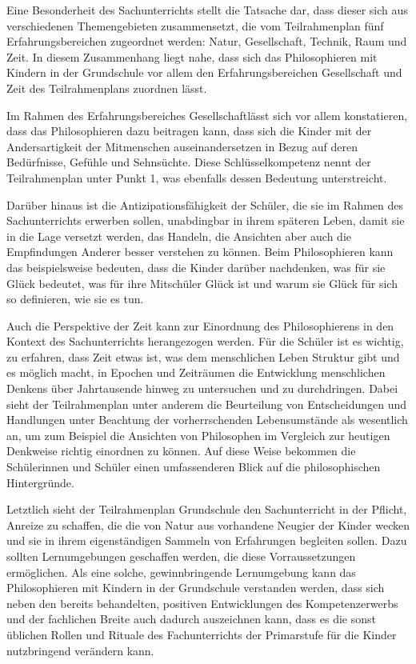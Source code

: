 Eine Besonderheit des Sachunterrichts stellt die Tatsache dar, dass dieser sich aus verschiedenen Themengebieten zusammensetzt, die vom Teilrahmenplan fünf Erfahrungsbereichen zugeordnet werden: Natur, Gesellschaft, Technik, Raum und Zeit. 
In diesem Zusammenhang liegt nahe, dass sich das Philosophieren mit Kindern in der Grundschule vor allem den Erfahrungsbereichen \glqq Gesellschaft\grqq{} und \glqq Zeit\grqq{} des Teilrahmenplans zuordnen lässt. 

Im Rahmen des Erfahrungsbereiches \glqq Gesellschaft\grqq lässt sich vor allem konstatieren, dass das Philosophieren dazu beitragen kann, dass sich die Kinder mit der Andersartigkeit der Mitmenschen auseinandersetzen in Bezug auf deren Bedürfnisse, Gefühle und Sehnsüchte. 
Diese Schlüsselkompetenz nennt der Teilrahmenplan unter Punkt 1, was ebenfalls dessen Bedeutung unterstreicht. 

Darüber hinaus ist die Antizipationsfähigkeit der Schüler, die sie im Rahmen des Sachunterrichts erwerben sollen, unabdingbar in ihrem späteren Leben, damit sie in die Lage versetzt werden, das Handeln, die Ansichten aber auch die Empfindungen Anderer besser verstehen zu können. 
Beim Philosophieren kann das beispielsweise bedeuten, dass die Kinder darüber nachdenken, was für sie Glück bedeutet, was für ihre Mitschüler Glück ist und warum sie Glück für sich so definieren, wie sie es tun. 

Auch die Perspektive der Zeit kann zur Einordnung des Philosophierens in den Kontext des Sachunterrichts herangezogen werden. 
Für die Schüler ist es wichtig, zu erfahren, dass Zeit etwas ist, was dem menschlichen Leben Struktur gibt und es möglich macht, in Epochen und Zeiträumen die Entwicklung menschlichen Denkens über Jahrtausende hinweg zu untersuchen und zu durchdringen. 
Dabei sieht der Teilrahmenplan unter anderem die \glqq Beurteilung von Entscheidungen und Handlungen\grqq{}\cite[S.\,15]{MBFJ06} unter Beachtung der vorherrschenden Lebensumstände als wesentlich an, um zum Beispiel die Ansichten von Philosophen im Vergleich zur heutigen Denkweise richtig einordnen zu können. 
Auf diese Weise bekommen die Schülerinnen und Schüler einen umfassenderen Blick auf die philosophischen Hintergründe.

Letztlich sieht der Teilrahmenplan Grundschule den Sachunterricht in der Pflicht, Anreize zu schaffen, die die von Natur aus vorhandene Neugier der Kinder wecken und sie in ihrem eigenständigen Sammeln von Erfahrungen begleiten sollen. 
Dazu sollten Lernumgebungen geschaffen werden, die diese Vorraussetzungen ermöglichen. 
Als eine solche, gewinnbringende Lernumgebung kann das Philosophieren mit Kindern in der Grundschule verstanden werden, dass sich neben den bereits behandelten, positiven Entwicklungen des Kompetenzerwerbs und der fachlichen Breite
auch dadurch auszeichnen kann, dass es die sonst üblichen Rollen und Rituale des Fachunterrichts der Primarstufe für die Kinder nutzbringend verändern kann.


